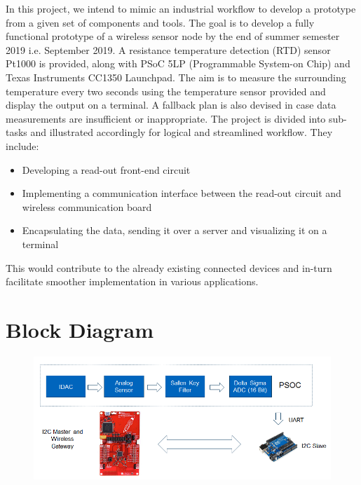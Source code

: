 \documentclass[conference]{IEEEtran}
\begin{document}
In this project, we intend to mimic an industrial workflow to develop a prototype from a given set of components and tools. The goal is to develop a fully functional prototype of a wireless sensor node by the end of summer semester 2019 i.e. September 2019. A resistance temperature detection (RTD) sensor Pt1000 is provided, along with PSoC 5LP (Programmable System-on Chip) and Texas Instruments CC1350 Launchpad. The aim is to measure the surrounding temperature every two seconds using the temperature sensor provided and display the output on a terminal. A fallback plan is also devised in case data measurements are insufficient or inappropriate. The project is divided into sub-tasks and illustrated accordingly for logical and streamlined workflow. They include:
\begin{itemize}
	\item Developing a read-out front-end circuit 
	\item Implementing a communication interface between the read-out circuit and wireless communication board
	\item Encapsulating the data, sending it over a server and visualizing it on a terminal
\end{itemize}
 This would contribute to the already existing connected devices and in-turn facilitate smoother implementation in various applications.
 
 \section{Block Diagram}
\begin{figure}
	\centering
	\includegraphics[width=1\linewidth, height=0.2\textheight]{00_block_diagram}
	\caption{}
	\label{fig:00blockdiagram}
\end{figure}

\end{document}
